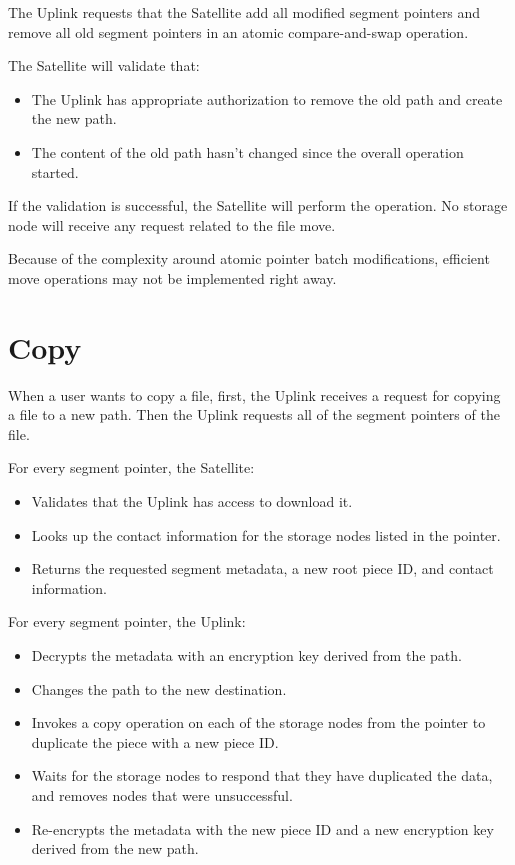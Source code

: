 \documentclass[8pt,fleqn,openany]{book}
\begin{document}
 The Uplink requests that the Satellite add
  all modified segment pointers and remove all old segment pointers in an
  atomic compare-and-swap operation.

The Satellite will validate that:
\begin{itemize}
\item The Uplink has appropriate authorization to remove the old path and create
  the new path.
\item The content of the old path hasn't changed since the overall operation
  started.
\end{itemize}

If the validation is successful, the Satellite will perform the operation.
 No storage node will receive any request related to the file move.

Because of the complexity around atomic pointer batch modifications, efficient
move operations may not be implemented right away.

\section{Copy}

When a user wants to copy a file, first, the Uplink receives a request for
copying a file to a new path.
Then the Uplink requests all of the segment pointers of the file.

For every segment pointer, the Satellite:
  \begin{itemize}
  \item Validates that the Uplink has access to download it.
  \item Looks up the contact information for the storage nodes listed in the
    pointer.
  \item Returns the requested segment metadata, a new root piece ID, and
    contact information.
  \end{itemize}

For every segment pointer, the Uplink:
  \begin{itemize}
  \item Decrypts the metadata with an encryption key derived from the path.
  \item Changes the path to the new destination.
  \item Invokes a copy operation on each of the storage nodes from the pointer
    to duplicate the piece with a new piece ID.
  \item Waits for the storage nodes to respond that they have duplicated the
    data, and removes nodes that were unsuccessful.
  \item Re-encrypts the metadata with the new piece ID and a new encryption key
    derived from the new path.
  \end{itemize}
\end{document}
